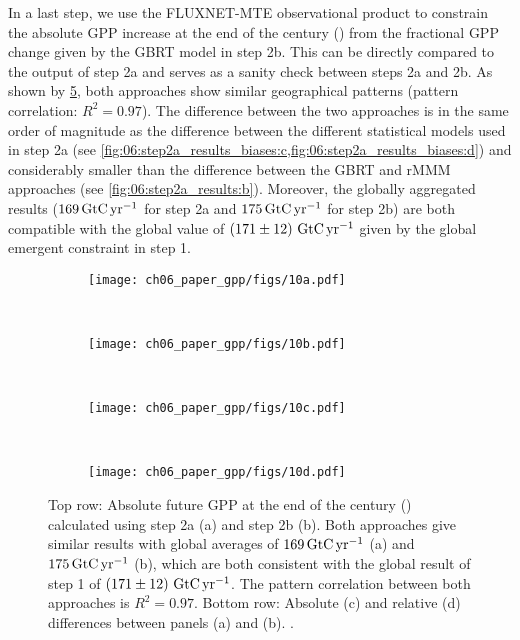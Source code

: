 In a last step, we use the FLUXNET-MTE observational product to constrain the
absolute \ac{GPP} increase at the end of the  century
() from the fractional \ac{GPP} change given by the \ac{GBRT}
model in step 2b. This can be directly compared to the output of step 2a and
serves as a sanity check between steps 2a and 2b. As shown by
\cref{fig:06:comparison_step2a_step2b}, both approaches show similar
geographical patterns (pattern correlation: $R^2 = 0.97$). The difference
between the two approaches is in the same order of magnitude as the difference
between the different statistical models used in step 2a (see
\cref{fig:06:step2a_results_biases:c,fig:06:step2a_results_biases:d}) and
considerably smaller than the difference between the \ac{GBRT} and r\acs{MMM}
approaches (see \cref{fig:06:step2a_results:b}). Moreover, the globally
aggregated results ($169 \unit{\GtCyr{}}$ for step 2a and $175 \unit{\GtCyr{}}$
for step 2b) are both compatible with the global value of
$\pmrangeunit{171}{12}{\GtCyr{}}$ given by the global emergent constraint in
step 1.

\begin{figure}[t]
  \centering
  \begin{subfigure}[b]{\SubfigureWidth{}}
    \texttt{[image: ch06\_paper\_gpp/figs/10a.pdf]}
    \caption{}
    \label{fig:06:comparison_step2a_step2b:a}
  \end{subfigure}
  ~
  \begin{subfigure}[b]{\SubfigureWidth{}}
    \texttt{[image: ch06\_paper\_gpp/figs/10b.pdf]}
    \caption{}
    \label{fig:06:comparison_step2a_step2b:b}
  \end{subfigure}
  \\
  \begin{subfigure}[b]{\SubfigureWidth{}}
    \texttt{[image: ch06\_paper\_gpp/figs/10c.pdf]}
    \caption{}
    \label{fig:06:comparison_step2a_step2b:c}
  \end{subfigure}
  ~
  \begin{subfigure}[b]{\SubfigureWidth{}}
    \texttt{[image: ch06\_paper\_gpp/figs/10d.pdf]}
    \caption{}
    \label{fig:06:comparison_step2a_step2b:d}
  \end{subfigure}
  \caption[
    Comparison of our two independent approaches from step 2a and step 2b.
  ]{
    Top row: Absolute future \acf{GPP} at the end of the  century
    () calculated using step 2a (a) and step 2b (b). Both
    approaches give similar results with global averages of $169
    \unit{\GtCyr{}}$ (a) and $175 \unit{\GtCyr{}}$ (b), which are both
    consistent with the global result of step 1 of
    $\pmrangeunit{171}{12}{\GtCyr{}}$. The pattern correlation between both
    approaches is $R^2 = 0.97$. Bottom row: Absolute (c) and relative (d)
    differences between panels (a) and (b). .
  }
  \label{fig:06:comparison_step2a_step2b}
\end{figure}


